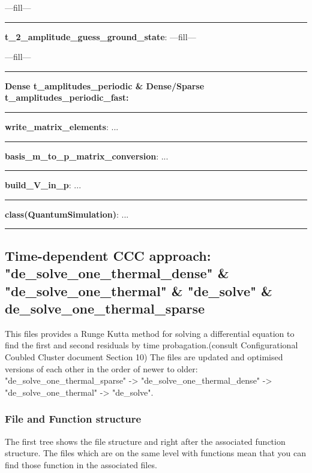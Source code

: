 \documentclass[a4paper,10pt]{article}
\begin{document}
---fill---

\noindent\rule{\linewidth}{0.4pt}

\textbf{t\_2\_amplitude\_guess\_ground\_state}: ---fill---

---fill---

\noindent\rule{\linewidth}{0.4pt}


\textbf{\newline Dense t\_amplitudes\_periodic \& Dense/Sparse t\_amplitudes\_periodic\_fast:}

\noindent\rule{\linewidth}{0.4pt}

\textbf{write\_matrix\_elements}: ...

\noindent\rule{\linewidth}{0.4pt}

\textbf{basis\_m\_to\_p\_matrix\_conversion}: ...

\noindent\rule{\linewidth}{0.4pt}

\textbf{build\_V\_in\_p}: ...

\noindent\rule{\linewidth}{0.4pt}

\textbf{class(QuantumSimulation)}: ...

\noindent\rule{\linewidth}{0.4pt}




\subsection{Time-dependent CCC approach: "de\_solve\_one\_thermal\_dense" \newline \& "de\_solve\_one\_thermal" \& "de\_solve" \& de\_solve\_one\_thermal\_sparse}

This files provides a Runge Kutta method for solving a differential equation to find the first and second residuals by time probagation.(consult Configurational Coubled Cluster document
Section 10) The files are updated and optimised versions of each other in the order of newer to older: "de\_solve\_one\_thermal\_sparse" -> "de\_solve\_one\_thermal\_dense" -> "de\_solve\_one\_thermal" -> "de\_solve".



\subsubsection{File and Function structure}

The first tree shows the file structure and right after the associated function structure. The files which are on the same level with functions mean that you can find those function in the associated files.
\end{document}
